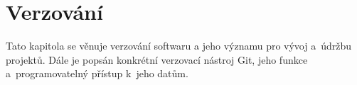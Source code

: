 
\chapter{Verzování}
\label{chap:versioning}
Tato kapitola se věnuje verzování softwaru a jeho významu pro vývoj a~údržbu projektů. Dále je popsán konkrétní verzovací nástroj Git, jeho funkce a~programovatelný přístup k~jeho datům.






\endinput
